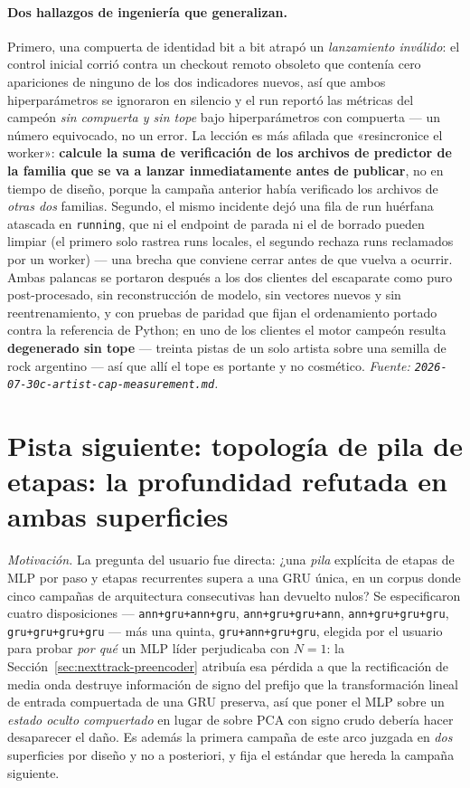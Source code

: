 \documentclass[11pt]{article}
\begin{document}
\paragraph{Dos hallazgos de ingeniería que generalizan.} Primero, una compuerta de
identidad bit a bit atrapó un \emph{lanzamiento inválido}: el control inicial corrió
contra un checkout remoto obsoleto que contenía cero apariciones de ninguno de los
dos indicadores nuevos, así que ambos hiperparámetros se ignoraron en silencio y el
run reportó las métricas del campeón \emph{sin compuerta y sin tope} bajo
hiperparámetros con compuerta --- un número equivocado, no un error. La lección es
más afilada que «resincronice el worker»: \textbf{calcule la suma de verificación de
los archivos de predictor de la familia que se va a lanzar inmediatamente antes de
publicar}, no en tiempo de diseño, porque la campaña anterior había verificado los
archivos de \emph{otras dos} familias. Segundo, el mismo incidente dejó una fila de
run huérfana atascada en \texttt{running}, que ni el endpoint de parada ni el de
borrado pueden limpiar (el primero solo rastrea runs locales, el segundo rechaza
runs reclamados por un worker) --- una brecha que conviene cerrar antes de que vuelva
a ocurrir. Ambas palancas se portaron después a los dos clientes del escaparate como
puro post-procesado, sin reconstrucción de modelo, sin vectores nuevos y sin
reentrenamiento, y con pruebas de paridad que fijan el ordenamiento portado contra la
referencia de Python; en uno de los clientes el motor campeón resulta
\textbf{degenerado sin tope} --- treinta pistas de un solo artista sobre una semilla
de rock argentino --- así que allí el tope es portante y no cosmético.
\emph{Fuente: \texttt{2026-07-30c-artist-cap-measurement.md}.}

\section{Pista siguiente: topología de pila de etapas: la profundidad refutada en ambas superficies}
\label{sec:nexttrack-stagestack}
\emph{Motivación.} La pregunta del usuario fue directa: ¿una \emph{pila} explícita
de etapas de MLP por paso y etapas recurrentes supera a una GRU única, en un corpus
donde cinco campañas de arquitectura consecutivas han devuelto nulos? Se
especificaron cuatro disposiciones --- \texttt{ann+gru+ann+gru},
\texttt{ann+gru+gru+ann}, \texttt{ann+gru+gru+gru}, \texttt{gru+gru+gru+gru} ---
más una quinta, \texttt{gru+ann+gru+gru}, elegida por el usuario para probar
\emph{por qué} un MLP líder perjudicaba con $N=1$: la
Sección~\ref{sec:nexttrack-preencoder} atribuía esa pérdida a que la rectificación de media
onda destruye información de signo del prefijo que la transformación lineal de
entrada compuertada de una GRU preserva, así que poner el MLP sobre un \emph{estado
oculto compuertado} en lugar de sobre PCA con signo crudo debería hacer desaparecer
el daño. Es además la primera campaña de este arco juzgada en \emph{dos}
superficies por diseño y no a posteriori, y fija el estándar que hereda la campaña
siguiente.
\end{document}
